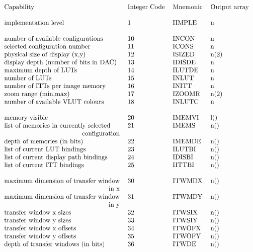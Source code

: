 \[\begin{tabular}{llll}
Capability & Integer Code & Mnemonic & Output array \\
\\
implementation level & 1 & IIMPLE & n \\
\\
number of available configurations & 10 & INCON & n \\
selected configuration number & 11 & ICONS & n \\
physical size of display (x,y) & 12 & ISIZED & n(2) \\
display depth (number of bits in DAC) & 13 & IDISDE & n \\
maximum depth of LUTs & 14 & ILUTDE & n \\
number of LUTs & 15 & INLUT & n \\
number of ITTs per image memory & 16 & INITT & n \\
zoom range (min,max) & 17 & IZOOMR & n(2) \\
number of available VLUT colours & 18 & INLUTC & n \\
\\
memory visible & 20 & IMEMVI & l() \\
list of memories in currently selected & 21 & IMEMS & n() \\
\hfill configuration \\
depth of memories (in bits) & 22 & IMEMDE & n() \\
list of current LUT bindings & 23 & ILUTBI & n() \\
list of current display path bindings & 24 & IDISBI & n() \\
list of current ITT bindings & 25 & IITTBI & n() \\
\\
maximum dimension of transfer window & 30 & ITWMDX & n() \\
\hfill in x \\
maximum dimension of transfer window & 31 & ITWMDY & n() \\
\hfill in y \\
transfer window x sizes & 32 & ITWSIX & n() \\
transfer window y sizes & 33 & ITWSIY & n() \\
transfer window x offsets & 34 & ITWOFX & n() \\
transfer window y offsets & 35 & ITWOFY & n() \\
depth of transfer windows (in bits) & 36 & ITWDE & n() \\
\end{tabular}\]

